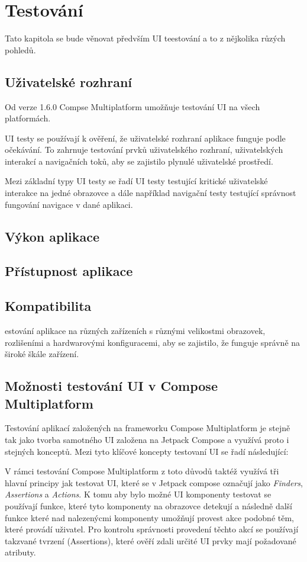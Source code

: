\chapter{Testování} \label{testsSection}
Tato kapitola se bude věnovat předvším UI teestování a to z nějkolika růzých pohledů. 

\section{Uživatelské rozhraní}
Od verze 1.6.0 Compse Multiplatform umožňuje testování UI na všech platformách. \cite{composeNews1.6.0}

UI testy se používají k ověření, že uživatelské rozhraní aplikace funguje podle očekávání. To zahrnuje testování prvků uživatelského rozhraní, uživatelských 
interakcí a navigačních toků, aby se zajistilo plynulé uživatelské prostředí.

Mezi základní typy UI testy se řadí UI testy testující kritické uživatelské interakce na jedné obrazovce a dále například navigační testy testující
správnost fungování navigace v dané aplikaci.


\section{Výkon aplikace}

\section{Přístupnost aplikace}


\section{Kompatibilita}
estování aplikace na různých zařízeních s různými velikostmi obrazovek, rozlišeními a hardwarovými konfiguracemi, aby se zajistilo, že funguje 
správně na široké škále zařízení.


\section{Možnosti testování UI v Compose Multiplatform}
Testování aplikací založených na frameworku Compose Multiplatform je stejně tak jako tvorba samotného UI založena na Jetpack Compose a využívá 
proto i stejných konceptů. Mezi tyto klíčové koncepty testovaní UI se řadí následující:


V rámci testování
Compose Multiplatform z toto důvodů taktéž využívá tři hlavní principy jak testovat UI, které se v Jetpack compose
označují jako \textit{Finders}, \textit{Assertions} a \textit{Actions}. 
K tomu aby bylo možné UI komponenty testovat se používají funkce, které tyto komponenty na obrazovce detekují a následně další funkce které nad nalezenýcmi 
komponenty umožňují provest akce podobné těm, které provádí uživatel. Pro kontrolu správnosti provedení těchto akcí se používají takzvané tvrzení 
(Assertions), které ověří zdali určité UI prvky mají požadované atributy.

